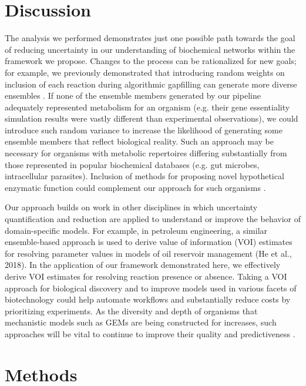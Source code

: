 \documentclass[11pt,twocolumn,notitlepage,openany,twoside]{book}
\begin{document}
\begin{refsection}
\section{Discussion}

The analysis we performed demonstrates just one possible path towards the goal of reducing uncertainty in our understanding of biochemical networks within the framework we propose. Changes to the process can be rationalized for new goals; for example, we previously demonstrated that introducing random weights on inclusion of each reaction during algorithmic gapfilling can generate more diverse ensembles \cite{Biggs2017-md}. If none of the ensemble members generated by our pipeline adequately represented metabolism for an organism (e.g. their gene essentiality simulation results were vastly different than experimental observations), we could introduce such random variance to increase the likelihood of generating some ensemble members that reflect biological reality. Such an approach may be necessary for organisms with metabolic repertoires differing substantially from those represented in popular biochemical databases (e.g. gut microbes, intracellular parasites). Inclusion of methods for proposing novel hypothetical enzymatic function could complement our approach for such organisms \cite{Hatzimanikatis2005-wy,Jeffryes2015-bm}.

Our approach builds on work in other disciplines in which uncertainty quantification and reduction are applied to understand or improve the behavior of domain-specific models. For example, in petroleum engineering, a similar ensemble-based approach is used to derive value of information (VOI) estimates for resolving parameter values in models of oil reservoir management \cite{He2018-nb}(He et al., 2018). In the application of our framework demonstrated here, we effectively derive VOI estimates for resolving reaction presence or absence. Taking a VOI approach for biological discovery and to improve models used in various facets of biotechnology could help automate workflows and substantially reduce costs by prioritizing experiments. As the diversity and depth of organisms that mechanistic models such as GEMs are being constructed for increases, such approaches will be vital to continue to improve their quality and predictiveness \cite{Magnusdottir2017-dk,Monk2014-fa}.

\section{Methods}

\end{refsection}
\end{document}
